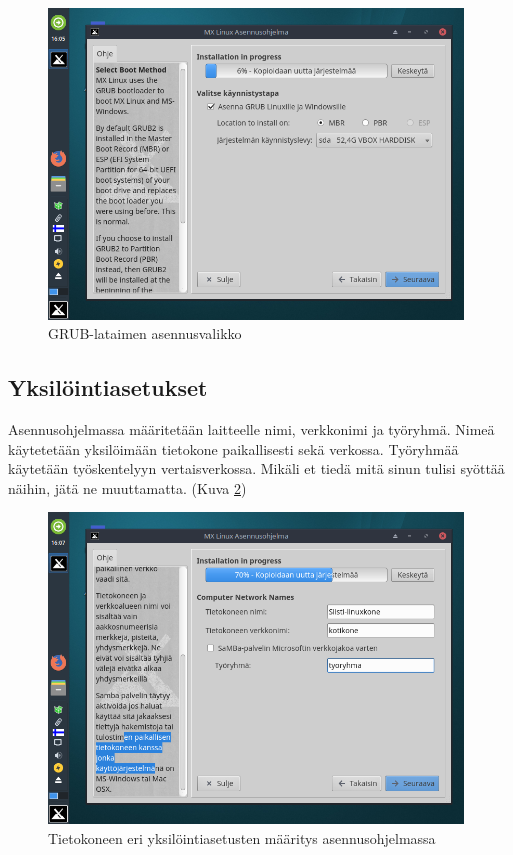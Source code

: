 \documentclass[a4paper, 12pt, finnish]{article}
\begin{document}
\begin{figure}[htpb]
    \begin{center}
        \includegraphics[width=0.98\textwidth]{asen/asennus_grub}
        \caption{GRUB-lataimen asennusvalikko}
        \label{fig:grub}
    \end{center}
\end{figure}
\clearpage
\subsection{Yksilöintiasetukset}

Asennusohjelmassa määritetään laitteelle nimi, verkkonimi ja työryhmä. Nimeä käytetetään yksilöimään tietokone paikallisesti sekä verkossa. Työryhmää käytetään työskentelyyn vertaisverkossa. Mikäli et tiedä mitä sinun tulisi syöttää näihin, jätä ne muuttamatta. (Kuva \ref{fig:hosts})

\begin{figure}[htpb]
    \begin{center}
        \includegraphics[width=0.98\textwidth]{asen/asennus_hosts}
        \caption{Tietokoneen eri yksilöintiasetusten määritys asennusohjelmassa}
        \label{fig:hosts}
    \end{center}
\end{figure}
\clearpage
\end{document}
